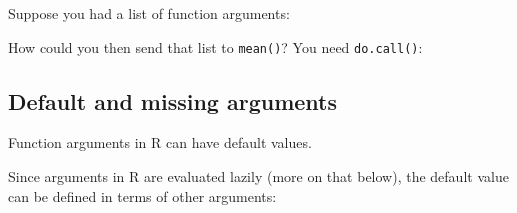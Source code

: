 Suppose you had a list of function arguments: 

\begin{Shaded}
\begin{Highlighting}[]
\StringTok{ }\NormalTok{(}\NormalTok{:}\NormalTok{, } \NormalTok{)}
\end{Highlighting}
\end{Shaded}

How could you then send that list to \texttt{mean()}? You need
\texttt{do.call()}:

\begin{Shaded}
\begin{Highlighting}[]
\NormalTok{(}\NormalTok{:}\NormalTok{, } \NormalTok{))}
\NormalTok{(}\NormalTok{:}\NormalTok{, } \NormalTok{)}
\end{Highlighting}
\end{Shaded}

\subsection{Default and missing arguments}

Function arguments in R can have default values.

\begin{Shaded}
\begin{Highlighting}[]
\StringTok{ } \NormalTok{, } \NormalTok{) \{}
\NormalTok{\}}
\NormalTok{()}
\end{Highlighting}
\end{Shaded}

Since arguments in R are evaluated lazily (more on that below), the
default value can be defined in terms of other arguments:

\begin{Shaded}
\begin{Highlighting}[]
\StringTok{ } \NormalTok{, } \StringTok{ }\NormalTok{) \{}
\NormalTok{\}}
\NormalTok{()}
\NormalTok{(}\NormalTok{)}
\end{Highlighting}
\end{Shaded}

